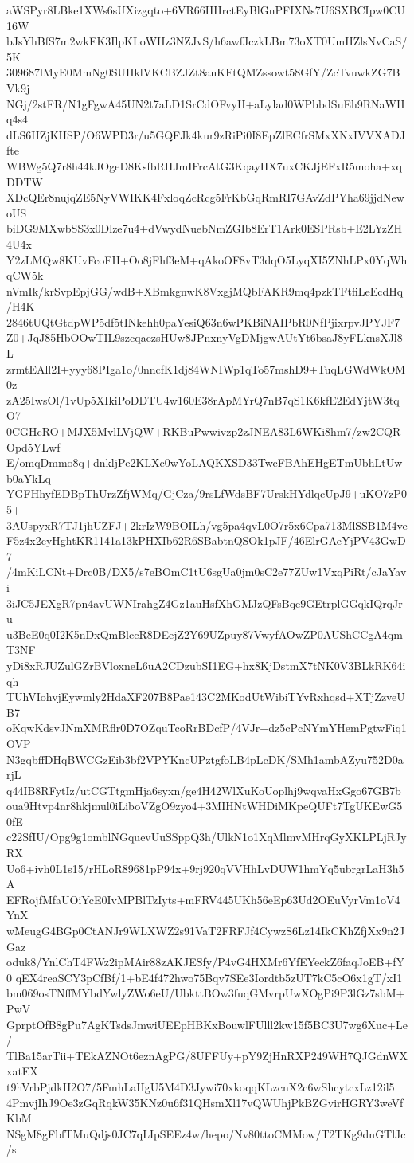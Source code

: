 aWSPyr8LBke1XWs6sUXizgqto+6VR66HHrctEyBlGnPFIXNs7U6SXBCIpw0CU16W
bJsYhBfS7m2wkEK3IlpKLoWHz3NZJvS/h6awfJczkLBm73oXT0UmHZlsNvCaS/5K
309687lMyE0MmNg0SUHklVKCBZJZt8anKFtQMZssowt58GfY/ZcTvuwkZG7BVk9j
NGj/2stFR/N1gFgwA45UN2t7aLD1SrCdOFvyH+aLylad0WPbbdSuEh9RNaWHq4s4
dLS6HZjKHSP/O6WPD3r/u5GQFJk4kur9zRiPi0I8EpZlECfrSMxXNxIVVXADJfte
WBWg5Q7r8h44kJOgeD8KsfbRHJmIFrcAtG3KqayHX7uxCKJjEFxR5moha+xqDDTW
XDcQEr8nujqZE5NyVWIKK4FxloqZcRcg5FrKbGqRmRI7GAvZdPYha69jjdNewoUS
biDG9MXwbSS3x0Dlze7u4+dVwydNuebNmZGIb8ErT1Ark0ESPRsb+E2LYzZH4U4x
Y2zLMQw8KUvFcoFH+Oo8jFhf3eM+qAkoOF8vT3dqO5LyqXI5ZNhLPx0YqWhqCW5k
nVmIk/krSvpEpjGG/wdB+XBmkgnwK8VxgjMQbFAKR9mq4pzkTFtfiLeEcdHq/H4K
2846tUQtGtdpWP5df5tINkehh0paYesiQ63n6wPKBiNAIPbR0NfPjixrpvJPYJF7
Z0+JqJ85HbOOwTIL9szcqaezsHUw8JPnxnyVgDMjgwAUtYt6bsaJ8yFLknsXJl8L
zrmtEAll2I+yyy68PIga1o/0nncfK1dj84WNIWp1qTo57mshD9+TuqLGWdWkOM0z
zA25IwsOl/1vUp5XIkiPoDDTU4w160E38rApMYrQ7nB7qS1K6kfE2EdYjtW3tqO7
0CGHcRO+MJX5MvlLVjQW+RKBuPwwivzp2zJNEA83L6WKi8hm7/zw2CQROpd5YLwf
E/omqDmmo8q+dnkljPe2KLXc0wYoLAQKXSD33TwcFBAhEHgETmUbhLtUwb0aYkLq
YGFHhyfEDBpThUrzZfjWMq/GjCza/9rsLfWdsBF7UrskHYdlqcUpJ9+uKO7zP05+
3AUspyxR7TJ1jhUZFJ+2krIzW9BOILh/vg5pa4qvL0O7r5x6Cpa713MlSSB1M4ve
F5z4x2cyHghtKR1141a13kPHXIb62R6SBabtnQSOk1pJF/46ElrGAeYjPV43GwD7
/4mKiLCNt+Drc0B/DX5/s7eBOmC1tU6sgUa0jm0sC2e77ZUw1VxqPiRt/cJaYavi
3iJC5JEXgR7pn4avUWNIrahgZ4Gz1auHsfXhGMJzQFsBqe9GEtrplGGqkIQrqJru
u3BeE0q0I2K5nDxQmBlccR8DEejZ2Y69UZpuy87VwyfAOwZP0AUShCCgA4qmT3NF
yDi8xRJUZulGZrBVloxneL6uA2CDzubSI1EG+hx8KjDstmX7tNK0V3BLkRK64iqh
TUhVIohvjEywmly2HdaXF207B8Pae143C2MKodUtWibiTYvRxhqsd+XTjZzveUB7
oKqwKdsvJNmXMRflr0D7OZquTcoRrBDcfP/4VJr+dz5cPcNYmYHemPgtwFiq1OVP
N3gqbffDHqBWCGzEib3bf2VPYKncUPztgfoLB4pLcDK/SMh1ambAZyu752D0arjL
q44IB8RFytIz/utCGTtgmHja6syxn/ge4H42WlXuKoUoplhj9wqvaHxGgo67GB7b
oua9Htvp4nr8hkjmul0iLiboVZgO9zyo4+3MIHNtWHDiMKpeQUFt7TgUKEwG50fE
c22SfIU/Opg9g1omblNGquevUuSSppQ3h/UlkN1o1XqMlmvMHrqGyXKLPLjRJyRX
Uo6+ivh0L1s15/rHLoR89681pP94x+9rj920qVVHhLvDUW1hmYq5ubrgrLaH3h5A
EFRojfMfaUOiYcE0IvMPBlTzIyts+mFRV445UKh56eEp63Ud2OEuVyrVm1oV4YnX
wMeugG4BGp0CtANJr9WLXWZ2s91VaT2FRFJf4CywzS6Lz14IkCKhZfjXx9n2JGaz
oduk8/YnlChT4FWz2ipMAir88zAKJESfy/P4vG4HXMr6YfEYeckZ6faqJoEB+fY0
qEX4reaSCY3pCfBf/1+bE4f472hwo75Bqv7SEe3Iordtb5zUT7kC5cO6x1gT/xI1
bm069osTNffMYbdYwlyZWo6eU/UbkttBOw3fuqGMvrpUwXOgPi9P3lGz7sbM+PwV
GprptOfB8gPu7AgKTsdsJmwiUEEpHBKxBouwlFUlll2kw15f5BC3U7wg6Xuc+Le/
TlBa15arTii+TEkAZNOt6eznAgPG/8UFFUy+pY9ZjHnRXP249WH7QJGdnWXxatEX
t9hVrbPjdkH2O7/5FmhLaHgU5M4D3Jywi70xkoqqKLzcnX2c6wShcytcxLz12il5
4PmvjIhJ9Oe3zGqRqkW35KNz0u6f31QHsmXl17vQWUhjPkBZGvirHGRY3weVfKbM
NSgM8gFbfTMuQdjs0JC7qLIpSEEz4w/hepo/Nv80ttoCMMow/T2TKg9dnGTlJc/s
